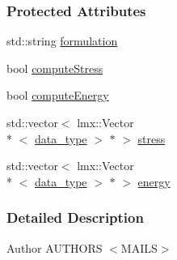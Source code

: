 \subsubsection*{Protected Attributes}
\begin{DoxyCompactItemize}
\item 
std\-::string \hyperlink{classmknix_1_1_flex_body_acb6f1ed2a9f207ceb39d485aabc2fbcf}{formulation}
\item 
bool \hyperlink{classmknix_1_1_flex_body_aaacb11b0809c01edca2c7ef4ea41de7a}{compute\-Stress}
\item 
bool \hyperlink{classmknix_1_1_flex_body_a653efdbfbf4f6ec147407a1c7ffb3779}{compute\-Energy}
\item 
std\-::vector$<$ lmx\-::\-Vector\\*
$<$ \hyperlink{namespacemknix_a16be4b246fbf2cceb141e3a179111020}{data\-\_\-type} $>$ $\ast$ $>$ \hyperlink{classmknix_1_1_flex_body_ab7e82d08982714b26de3fff2a281d4f2}{stress}
\item 
std\-::vector$<$ lmx\-::\-Vector\\*
$<$ \hyperlink{namespacemknix_a16be4b246fbf2cceb141e3a179111020}{data\-\_\-type} $>$ $\ast$ $>$ \hyperlink{classmknix_1_1_flex_body_a9152c5c0047a854fd4875082e6ca191e}{energy}
\end{DoxyCompactItemize}


\subsubsection{Detailed Description}
\begin{DoxyAuthor}{Author}
A\-U\-T\-H\-O\-R\-S $<$\-M\-A\-I\-L\-S$>$ 
\end{DoxyAuthor}


